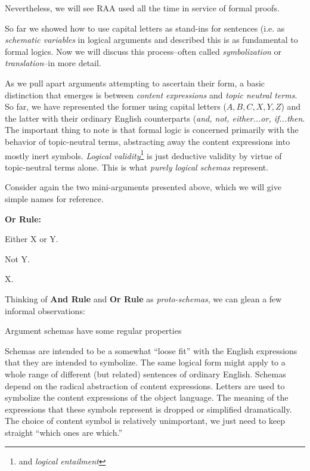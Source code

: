 Nevertheless, we will see RAA used all the time in service of formal proofs.

So far we showed how to use capital letters as stand-ins for sentences (i.e.
as \emph{schematic variables} in logical arguments and described this is as
fundamental to formal logics. Now we will discuss this process--often called
\emph{symbolization} or \emph{translation}--in more detail.

As we pull apart arguments attempting to ascertain their form, a basic
distinction that emerges is between \emph{content expressions} and \emph{topic
neutral terms}. So far, we have represented the former using capital letters
($A, B, C, X, Y, Z$) and the latter with their ordinary English counterparts
(\emph{and, not, either...or, if...then}. The important thing to note is that
formal logic is concerned primarily with the behavior of topic-neutral terms,
abstracting away the content expressions into mostly inert symbols.
\emph{Logical validity}\footnote{and \emph{logical entailment}} is just
deductive validity by virtue of topic-neutral terms alone. This is what
\emph{purely logical schemas} represent.

Consider again the two mini-arguments presented above, which we will give simple
names for reference.

 {
  \begin{argument}
  \item[] \textbf{Or Rule:}
  \item[] Either X or Y.
  \item[] Not Y.
  \item[\therefore] X.
  \end{argument}
}

Thinking of \textbf{And Rule} and \textbf{Or Rule} as \emph{proto-schemas}, we
can glean a few informal observations:

\begin{observation}
  \label{obs:argument-proto-schemas}
  Argument schemas have some regular properties
  \begin{outline}
  \1 Schemas are intended to be a somewhat ``loose fit'' with the English
    expressions that they are intended to symbolize. The same logical form
    might apply to a whole range of different (but related) sentences of
    ordinary English.
    \1 Schemas depend on the radical abstraction of content expressions.
    \2 Letters are used to symbolize the content expressions of the object
    language.
    \2 The meaning of the expressions that these symbols represent is dropped or
    simplified dramatically.
    \1 The choice of content symbol is relatively unimportant, we just need to
    keep straight ``which ones are which.''
  \end{outline}
\end{observation}

